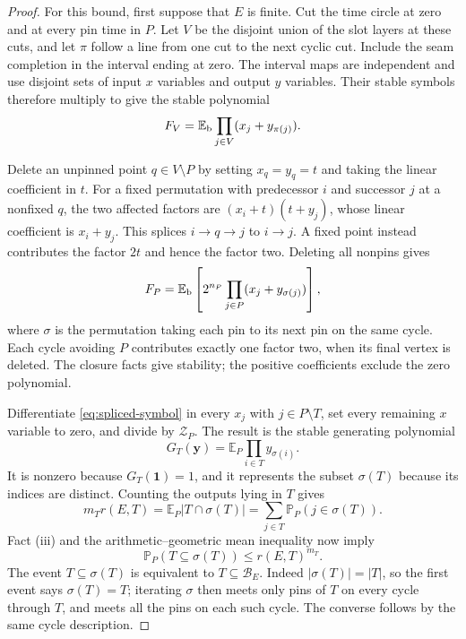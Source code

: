 \begin{proof}
For this bound, first suppose that $E$ is finite.  Cut the time circle at zero and
at every pin time in $P$.  Let $V$ be the disjoint union of the slot
layers at these cuts, and let $\pi$ follow a line from one cut to the
next cyclic cut.  Include the seam completion in the interval ending
at zero.  The interval maps are independent and use disjoint sets
of input $x$ variables and output $y$ variables.  Their stable symbols
therefore multiply to give the stable polynomial
\[
                  F_V=\mathbb E_{\rm b}
                         \prod_{j\in V}(x_j+y_{\pi(j)}).
\]

Delete an unpinned point $q\in V\setminus P$ by setting
$x_q=y_q=t$ and taking the linear coefficient in $t$.  For a fixed
permutation with predecessor $i$ and successor $j$ at a nonfixed $q$,
the two affected factors are $(x_i+t)(t+y_j)$, whose linear
coefficient is $x_i+y_j$.  This splices $i\to q\to j$ to $i\to j$.
A fixed point instead contributes the factor $2t$ and hence the
factor two.  Deleting all nonpins gives
\begin{equation}\label{eq:spliced-symbol}
 F_P=\mathbb E_{\rm b}\left[
         2^{n_P}\prod_{j\in P}(x_j+y_{\sigma(j)})\right],
\end{equation}
where $\sigma$ is the permutation taking each pin to its next pin
on the same cycle.  Each cycle avoiding $P$ contributes exactly one
factor two, when its final vertex is deleted.  The closure facts
give stability; the positive coefficients exclude the zero polynomial.

Differentiate \eqref{eq:spliced-symbol} in every $x_j$ with
$j\in P\setminus T$, set every remaining $x$ variable to zero, and
divide by $\mathcal Z_P$.  The result is the stable generating
polynomial
\begin{equation}\label{eq:pin-output-polynomial}
 G_T(\boldsymbol y)=\mathbb E_P\prod_{i\in T}y_{\sigma(i)}.
\end{equation}
It is nonzero because $G_T(\boldsymbol1)=1$, and it represents the
subset $\sigma(T)$ because its indices are distinct.  Counting the
outputs lying in $T$ gives
\[
 m_Tr(E,T)=\mathbb E_P|T\cap\sigma(T)|
                =\sum_{j\in T}\mathbb P_P(j\in\sigma(T)).
\]
Fact (iii) and the arithmetic--geometric mean inequality now imply
\[
              \mathbb P_P(T\subseteq\sigma(T))\le r(E,T)^{m_T}.
\]
The event $T\subseteq\sigma(T)$ is equivalent to
$T\subseteq\mathcal B_E$.  Indeed $|\sigma(T)|=|T|$, so the first
event says $\sigma(T)=T$; iterating $\sigma$ then meets only pins
of $T$ on every cycle through $T$, and meets all the pins on each
such cycle.  The converse follows by the same cycle description.


\end{proof}
